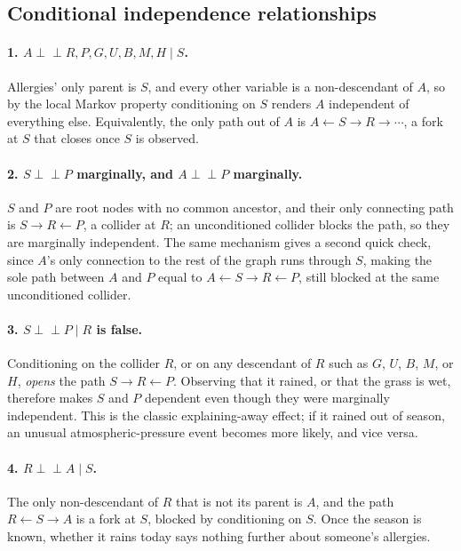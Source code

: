 \documentclass[11pt]{article}
\newcommand{\indep}{\perp\!\!\!\perp}
\begin{document}
\subsection*{Conditional independence relationships}

\paragraph{1. $A \indep R,P,G,U,B,M,H \mid S$.} Allergies' only parent is $S$,
and every other variable is a non-descendant of $A$, so by the local Markov
property conditioning on $S$ renders $A$ independent of everything else.
Equivalently, the only path out of $A$ is $A \leftarrow S \to R \to \cdots$, a
fork at $S$ that closes once $S$ is observed.

\paragraph{2. $S \indep P$ marginally, and $A \indep P$ marginally.} $S$ and $P$
are root nodes with no common ancestor, and their only connecting path is
$S \to R \leftarrow P$, a collider at $R$; an unconditioned collider blocks the
path, so they are marginally independent. The same mechanism gives a second
quick check, since $A$'s only connection to the rest of the graph runs through
$S$, making the sole path between $A$ and $P$ equal to
$A \leftarrow S \to R \leftarrow P$, still blocked at the same unconditioned
collider.

\paragraph{3. $S \indep P \mid R$ is \textbf{false}.} Conditioning on the
collider $R$, or on any descendant of $R$ such as $G$, $U$, $B$, $M$, or $H$,
\emph{opens} the path $S \to R \leftarrow P$. Observing that it rained, or that
the grass is wet, therefore makes $S$ and $P$ dependent even though they were
marginally independent. This is the classic explaining-away effect; if it
rained out of season, an unusual atmospheric-pressure event becomes more
likely, and vice versa.

\paragraph{4. $R \indep A \mid S$.} The only non-descendant of $R$ that is not
its parent is $A$, and the path $R \leftarrow S \to A$ is a fork at $S$, blocked
by conditioning on $S$. Once the season is known, whether it rains today says
nothing further about someone's allergies.
\end{document}
